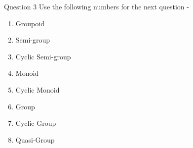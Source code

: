 \documentclass[xcolor=svgnames]{beamer}
\begin{document}
\begin{frame}{Question 3}
    Use the following numbers for the next question - 
    \begin{enumerate}
        \item Groupoid
        \item Semi-group
        \item Cyclic Semi-group 
        \item Monoid
        \item Cyclic Monoid
        \item Group
        \item Cyclic Group
        \item Quasi-Group
    \end{enumerate}
\end{frame}
\end{document}
